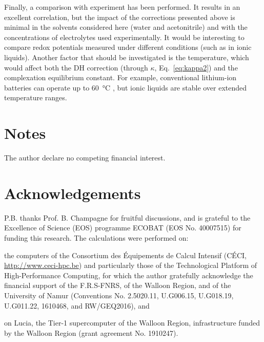 \documentclass[review,preprint]{elsarticle}
\begin{document}
Finally, a comparison with experiment has been performed. It results in an excellent correlation, but the impact of the corrections presented above is minimal in the solvents considered here (water and acetonitrile) and with the concentrations of electrolytes used experimentally. It would be interesting to compare redox potentials measured under different conditions (such as in ionic liquids). Another factor that should be investigated is the temperature, which would affect both the DH correction (through $\kappa$, Eq.~\eqref{eq:kappa2}) and the complexation equilibrium constant. For example, conventional lithium-ion batteries can operate up to \SI{60}{\degreeCelsius} \cite{maTemperatureEffectThermal2018}, but ionic liquids are stable over extended temperature ranges.
	
\section*{Notes}
The author declare no competing financial interest.

\section*{Acknowledgements}
P.B. thanks Prof. B. Champagne for fruitful discussions, and is grateful to the Excellence of Science (EOS) programme  ECOBAT (EOS No. 40007515) for funding this research. 
The calculations were performed on: \begin{inparaenum}[(i)]
	\item the computers of the Consortium des \'{E}quipements de Calcul Intensif (C\'{E}CI, \url{http://www.ceci-hpc.be}) and particularly those of the Technological Platform of High-Performance Computing, for which the author gratefully acknowledge the financial support of the F.R.S-FNRS, of the Walloon Region, and of the University of Namur (Conventions No. 2.5020.11, U.G006.15, U.G018.19, U.G011.22, 1610468, and RW/GEQ2016), and
	\item on Lucia, the Tier-1 supercomputer of the Walloon Region, infrastructure funded by the Walloon Region (grant agreement No. 1910247).
\end{inparaenum} 
	
	
 

	
\end{document}
